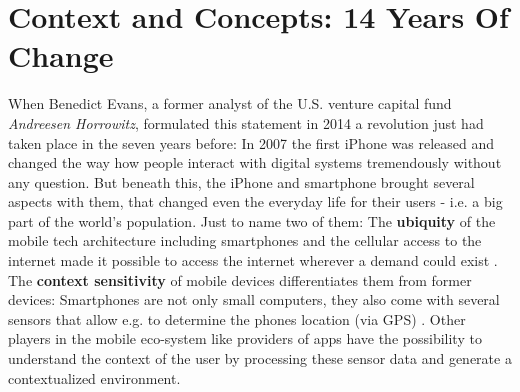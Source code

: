 \documentclass[11pt,a4paper]{article}
\begin{document}
\section*{Context and Concepts: 14 Years Of Change}
\begin{center}
 \autocite[][]{Evans.2014}
 \end{center}
When Benedict Evans, a former analyst of the U.S. venture capital fund \textit{Andreesen Horrowitz}, formulated this statement in 2014 a revolution just had taken place in the seven years before: In 2007 the first iPhone was released and changed the way how people interact with digital systems tremendously without any question. But beneath this, the iPhone and smartphone brought several aspects with them, that changed even the everyday life for their users - i.e. a big part of the world's population. Just to name two of them: The \textbf{ubiquity} of the mobile tech architecture including smartphones and the cellular access to the internet made it possible to access the internet wherever a demand could exist \autocite[][p.1]{Okazaki.2013}. The \textbf{context sensitivity} of mobile devices differentiates them from former devices: Smartphones are not only small computers, they also come with several sensors that allow e.g. to determine the phones location (via GPS) \autocite[][p.1]{Minch.2004}. Other players in the mobile eco-system like providers of apps have the possibility to understand the context of the user by processing these sensor data and generate a contextualized environment.
\end{document}
